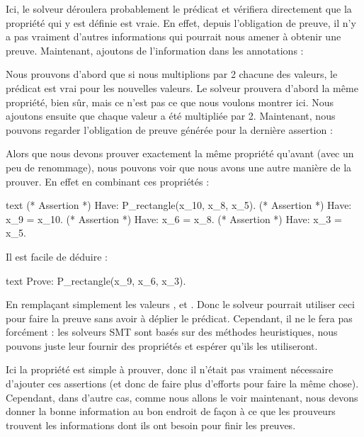 





Ici, le solveur déroulera probablement le prédicat et vérifiera directement
que la propriété qui y est définie est vraie. En effet, depuis l'obligation de
preuve, il n'y a pas vraiment d'autres informations qui pourrait nous
amener à obtenir une preuve. Maintenant, ajoutons de l'information dans les
annotations :






Nous prouvons d'abord que si nous multiplions par 2 chacune des valeurs, le
prédicat est vrai pour les nouvelles valeurs. Le solveur prouvera d'abord
la même propriété, bien sûr, mais ce n'est pas ce que nous voulons montrer ici.
Nous ajoutons ensuite que chaque valeur a été multipliée par 2. Maintenant, nous
pouvons regarder l'obligation de preuve générée pour la dernière assertion :





Alors que nous devons prouver exactement la même propriété qu'avant (avec un peu
de renommage), nous pouvons voir que nous avons une autre manière de la prouver.
En effet en combinant ces propriétés :


\begin{CodeBlock}{text}
(* Assertion *)
Have: P_rectangle(x_10, x_8, x_5).
(* Assertion *)
Have: x_9 = x_10.
(* Assertion *)
Have: x_6 = x_8.
(* Assertion *)
Have: x_3 = x_5.
\end{CodeBlock}


Il est facile de déduire :


\begin{CodeBlock}{text}
Prove: P_rectangle(x_9, x_6, x_3).
\end{CodeBlock}


En remplaçant simplement les valeurs ,  et
. Donc le solveur pourrait utiliser ceci pour faire la preuve
sans avoir à déplier le prédicat. Cependant, il ne le fera pas forcément : les
solveurs SMT sont basés sur des méthodes heuristiques, nous pouvons juste leur
fournir des propriétés et espérer qu'ils les utiliseront.


Ici la propriété est simple à prouver, donc il n'était pas vraiment nécessaire
d'ajouter ces assertions (et donc de faire plus d'efforts pour faire la même
chose). Cependant, dans d'autre cas, comme nous allons le voir maintenant, nous
devons donner la bonne information au bon endroit de façon à ce que les prouveurs
trouvent les informations dont ils ont besoin pour finir les preuves.


